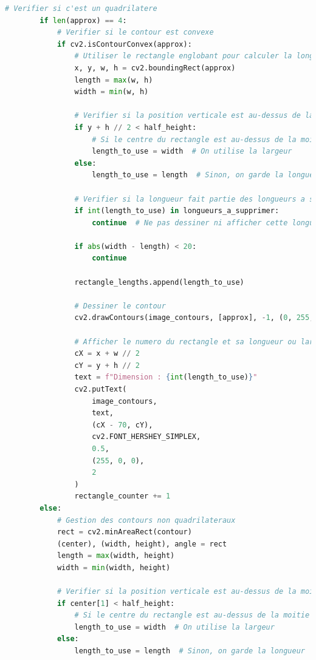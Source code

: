 \documentclass[11pt,letterpaper]{article}
\begin{document}
\begin{lstlisting}[language=python]
        # Verifier si c'est un quadrilatere
        if len(approx) == 4:
            # Verifier si le contour est convexe
            if cv2.isContourConvex(approx):
                # Utiliser le rectangle englobant pour calculer la longueur et la largeur
                x, y, w, h = cv2.boundingRect(approx)
                length = max(w, h)
                width = min(w, h)

                # Verifier si la position verticale est au-dessus de la moitie de l'image
                if y + h // 2 < half_height:
                    # Si le centre du rectangle est au-dessus de la moitie de l'image
                    length_to_use = width  # On utilise la largeur
                else:
                    length_to_use = length  # Sinon, on garde la longueur

                # Verifier si la longueur fait partie des longueurs a supprimer
                if int(length_to_use) in longueurs_a_supprimer:
                    continue  # Ne pas dessiner ni afficher cette longueur
                    
                if abs(width - length) < 20:
                    continue 

                rectangle_lengths.append(length_to_use)

                # Dessiner le contour
                cv2.drawContours(image_contours, [approx], -1, (0, 255, 0), 2)

                # Afficher le numero du rectangle et sa longueur ou largeur sur l'image
                cX = x + w // 2
                cY = y + h // 2
                text = f"Dimension : {int(length_to_use)}"
                cv2.putText(
                    image_contours,
                    text,
                    (cX - 70, cY),
                    cv2.FONT_HERSHEY_SIMPLEX,
                    0.5,
                    (255, 0, 0),
                    2
                )
                rectangle_counter += 1
        else:
            # Gestion des contours non quadrilateraux
            rect = cv2.minAreaRect(contour)
            (center), (width, height), angle = rect
            length = max(width, height)
            width = min(width, height)

            # Verifier si la position verticale est au-dessus de la moitie de l'image
            if center[1] < half_height:
                # Si le centre du rectangle est au-dessus de la moitie de l'image
                length_to_use = width  # On utilise la largeur
            else:
                length_to_use = length  # Sinon, on garde la longueur


\end{lstlisting}
\end{document}
